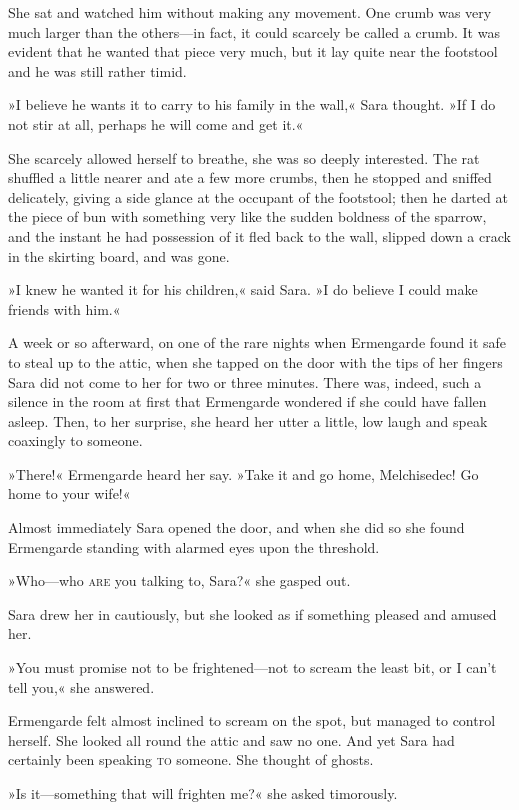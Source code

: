 She sat and watched him without making any movement. One crumb was very much larger than the others—in fact, it could scarcely be called a crumb. It was evident that he wanted that piece very much, but it lay quite near the footstool and he was still rather timid.

»I believe he wants it to carry to his family in the wall,« Sara thought. »If I do not stir at all, perhaps he will come and get it.«

She scarcely allowed herself to breathe, she was so deeply interested. The rat shuffled a little nearer and ate a few more crumbs, then he stopped and sniffed delicately, giving a side glance at the occupant of the footstool; then he darted at the piece of bun with something very like the sudden boldness of the sparrow, and the instant he had possession of it fled back to the wall, slipped down a crack in the skirting board, and was gone.

»I knew he wanted it for his children,« said Sara. »I do believe I could make friends with him.«

A week or so afterward, on one of the rare nights when Ermengarde found it safe to steal up to the attic, when she tapped on the door with the tips of her fingers Sara did not come to her for two or three minutes. There was, indeed, such a silence in the room at first that Ermengarde wondered if she could have fallen asleep. Then, to her surprise, she heard her utter a little, low laugh and speak coaxingly to someone.

»There!« Ermengarde heard her say. »Take it and go home, Melchisedec! Go home to your wife!«

Almost immediately Sara opened the door, and when she did so she found Ermengarde standing with alarmed eyes upon the threshold.

»Who—who \textsc{are} you talking to, Sara?« she gasped out.

Sara drew her in cautiously, but she looked as if something pleased and amused her.

»You must promise not to be frightened—not to scream the least bit, or I can't tell you,« she answered.

Ermengarde felt almost inclined to scream on the spot, but managed to control herself. She looked all round the attic and saw no one. And yet Sara had certainly been speaking \textsc{to} someone. She thought of ghosts.

»Is it—something that will frighten me?« she asked timorously.

